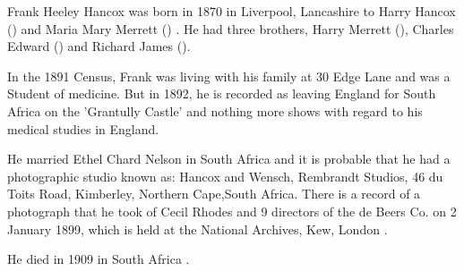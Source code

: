 
Frank Heeley Hancox was born in 1870 in Liverpool, Lancashire to Harry Hancox () and Maria Mary Merrett () \cite{FHHancoxBirth}. He had three brothers, Harry Merrett (), Charles Edward () and Richard James ().

In the 1891 Census, Frank was living with his family at 30 Edge Lane and was a Student of medicine.\cite{FrankHeeleyHancoxResidenceUK}  But in 1892, he is recorded as leaving England for South Africa on the 'Grantully Castle' \cite{FHHancoxTravel} and nothing more shows with regard to his medical studies in England. 

He married Ethel Chard Nelson in South Africa and it is probable that he had a photographic studio known as: Hancox and Wensch, Rembrandt Studios, 46 du Toits Road, Kimberley, Northern Cape,South Africa. There is a record of a photograph that he took of Cecil Rhodes and 9 directors of the de Beers Co. on 2 January 1899, which is held at the National Archives, Kew, London  \cite{FHHancoxPhotos}.

He died in 1909 in South Africa \cite{FHHancoxDeath}.
